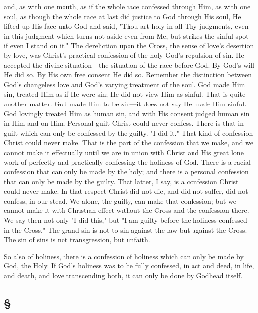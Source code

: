 \documentclass[draft]{ptfdoc}
\begin{document}
and, as with one mouth, as if the whole race 
confessed through Him, as with one soul, as 
though the whole race at last did justice to God 
through His soul, He lifted up His face unto 
God and said, "Thou art holy in all Thy judgments, 
even in this judgment which turns not 
aside even from Me, but strikes the sinful spot if 
even I stand on it." The dereliction upon the 
Cross, the sense of love's desertion by love, was 
Christ's practical confession of the holy God's 
repulsion of sin. He accepted the divine situation---the 
situation of the race before God. By 
God's will He did so. By His own free consent 
He did so. Remember the distinction between 
God's changeless love and God's varying treatment 
of the soul. God made Him sin, treated 
Him as if He were sin; He did not view Him as 
sinful. That is quite another matter. God made 
Him to be sin---it does not say He made Him sinful. 
God lovingly treated Him as human sin, and 
with His consent judged human sin in Him and 
on Him. Personal guilt Christ could never confess. 
There is that in guilt which can only be 
confessed by the guilty. "I did it." That kind 
of confession Christ could never make. That is 
the part of the confession that we make, and we 
cannot make it effectually until we are in union 
with Christ and His great lone work of perfectly 
and practically confessing the holiness 
of God. There is a racial confession that can 
only be made by the holy; and there is a personal 
confession that can only be made by the 
guilty. That latter, I say, is a confession Christ 
could never make. In that respect Christ did 
not die, and did not suffer, did not confess, in 
our stead. We alone, the guilty, can make 
that confession; but we cannot make it with 
Christian effect without the Cross and the 
confession there. We say then not only "I did 
this," but "I am guilty before the holiness 
confessed in the Cross." The grand sin is 
not to sin against the law but against the 
Cross. The sin of sins is not transgression, 
but unfaith. 

So also of holiness, there is a confession of 
holiness which can only be made by God, the 
Holy. If God's holiness was to be fully confessed, 
in act and deed, in life, and death, and 
love transcending both, it can only be done by 
Godhead itself. 

\subsection*{
\S
}
\end{document}
